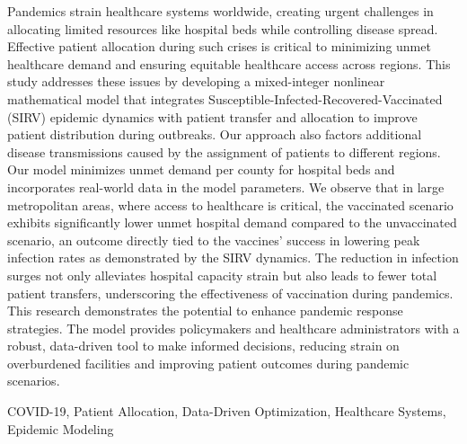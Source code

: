 \documentclass{article}
\begin{document}
\fontsize{10}{12}\selectfont



\begin{ieomabstract}
    Pandemics strain healthcare systems worldwide, creating urgent challenges in allocating limited resources like hospital beds while controlling disease spread. Effective patient allocation during such crises is critical to minimizing unmet healthcare demand and ensuring equitable healthcare access across regions. This study addresses these issues by developing a mixed-integer nonlinear mathematical model that integrates Susceptible-Infected-Recovered-Vaccinated (SIRV) epidemic dynamics with patient transfer and allocation to improve patient distribution during outbreaks. Our approach also factors additional disease transmissions caused by the assignment of patients to different regions. Our model minimizes unmet demand per county for hospital beds and incorporates real-world data in the model parameters. We observe that in large metropolitan areas, where access to healthcare is critical, the vaccinated scenario exhibits significantly lower unmet hospital demand compared to the unvaccinated scenario, an outcome directly tied to the vaccines' success in lowering peak infection rates as demonstrated by the SIRV dynamics. The reduction in infection surges not only alleviates hospital capacity strain but also leads to fewer total patient transfers, underscoring the effectiveness of vaccination during pandemics. This research demonstrates the potential to enhance pandemic response strategies. The model provides policymakers and healthcare administrators with a robust, data-driven tool to make informed decisions, reducing strain on overburdened facilities and improving patient outcomes during pandemic scenarios.
\end{ieomabstract}

\begin{ieomkeywords}
COVID-19, Patient Allocation, Data-Driven Optimization, Healthcare Systems, Epidemic Modeling
\end{ieomkeywords}
\end{document}
